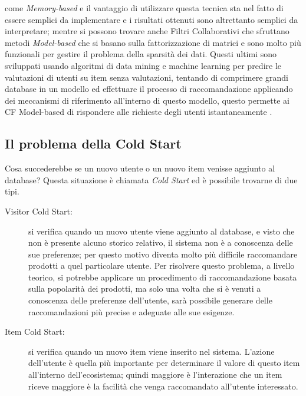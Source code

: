 come \textit{Memory-based} e il vantaggio di utilizzare questa tecnica sta nel fatto di essere semplici da implementare e i risultati 
ottenuti sono altrettanto semplici da interpretare; mentre si possono trovare anche Filtri Collaborativi che sfruttano metodi 
\textit{Model-based} che si basano sulla fattorizzazione di matrici e sono molto più funzionali per gestire il problema della 
sparsità dei dati. Questi ultimi sono sviluppati usando algoritmi di data mining e machine learning per predire le valutazioni di utenti 
su item senza valutazioni, tentando di comprimere grandi database in un modello ed effettuare il processo di raccomandazione applicando dei 
meccanismi di riferimento all'interno di questo modello, questo permette ai CF Model-based di rispondere alle richieste degli utenti 
istantaneamente \cite{model-based-approach-for-collaborative-filtering}.
%
\subsection{Il problema della Cold Start}
Cosa succederebbe se un nuovo utente o un nuovo item venisse aggiunto al database? Questa situazione è chiamata \textit{Cold Start} ed 
è possibile trovarne di due tipi.
\begin{description}
    \item[Visitor Cold Start:] si verifica quando un nuovo utente viene aggiunto al database, e visto che non è presente alcuno storico relativo, 
    il sistema non è a conoscenza delle sue preferenze; per questo motivo diventa molto più difficile raccomandare prodotti a quel particolare utente. 
    Per risolvere questo problema, a livello teorico, si potrebbe applicare un procedimento di raccomandazione basata sulla popolarità dei prodotti, ma solo una 
    volta che si è venuti a conoscenza delle preferenze dell'utente, sarà possibile generare delle raccomandazioni più precise e adeguate alle sue esigenze.
    \item[Item Cold Start:] si verifica quando un nuovo item viene inserito nel sistema. L'azione dell'utente è quella più importante per determinare 
    il valore di questo item all'interno dell'ecosistema; quindi maggiore è l'interazione che un item riceve maggiore è la facilità che venga raccomandato 
    all'utente interessato.
\end{description}
